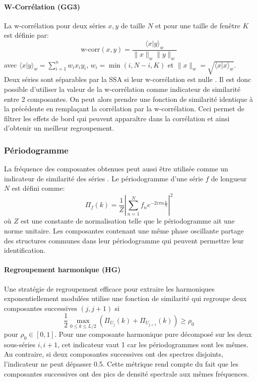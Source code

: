 \documentclass{gretsi}
\begin{document}
\paragraph{W-Corrélation (GG3)}\label{par:GG3} 
    La w-corrélation pour deux séries $x, y$ de taille $N$ et pour une taille de fenêtre $K$ est définie par:
    $$
    \text{w-corr}(x, y) = \frac{\langle x|y\rangle_w}{\|x\|_w\|y\|_w}
    $$avec $\langle x|y\rangle_w = \sum_{i=1}^n w_i x_i y_i$, $w_i = \min(i, N-i, K)$ et $\|x\|_w = \sqrt{\langle x|x\rangle_w}$. Deux séries sont séparables par la SSA si leur w-corrélation est nulle \cite{Golyandina_10_ssa}. Il est donc possible d'utiliser la valeur de la w-corrélation comme indicateur de similarité entre 2 composantes. On peut alors prendre une fonction de similarité identique à la précédente en remplaçant la corrélation par la w-corrélation. Ceci permet de filtrer les effets de bord qui peuvent apparaître dans la corrélation et ainsi d'obtenir un meilleur regroupement.


\subsubsection{Périodogramme}\label{ssub:per}

La fréquence des composantes obtenues peut aussi être utilisée comme un indicateur de similarité des séries \cite{Golyandina_10_ssa}. Le périodogramme d'une série $f$ de longueur $N$ est défini comme:
$$
\Pi_f(k) = \frac{1}{Z}\left|\sum_{n=1}^N f_n e^{-2i\pi n \frac{k}{N}}\right|^2
$$où $Z$ est une constante de normalisation telle que le périodogramme ait une norme unitaire. Les composantes contenant une même phase oscillante partage des structures communes dans leur périodogramme qui peuvent permettre leur identification.

\paragraph{Regroupement harmonique (HG)}\label{par:HG}
    Une stratégie de regroupement efficace pour extraire les harmoniques exponentiellement modulées \cite{alexandrov_05_auto} utilise une fonction de similarité qui regroupe deux composantes successives $(j, j+1)$ si 
    $$
    \frac{1}{2}\max_{0\le k \le L/2}\left(\Pi_{U_j}(k) + \Pi_{U_{j+1}}(k)\right) \ge \rho_0 
    $$pour $\rho_0\in \left[0, 1\right]$. Pour une composante harmonique pure décomposé sur les deux sous-séries $i,i+1$, cet indicateur vaut 1 car les périodogrammes sont les mêmes. Au contraire, si deux composantes successives ont des spectres disjoints, l'indicateur ne peut dépasser 0.5. Cette métrique rend compte du fait que les composantes successives ont des pics de densité spectrale aux mêmes fréquences.
\end{document}

